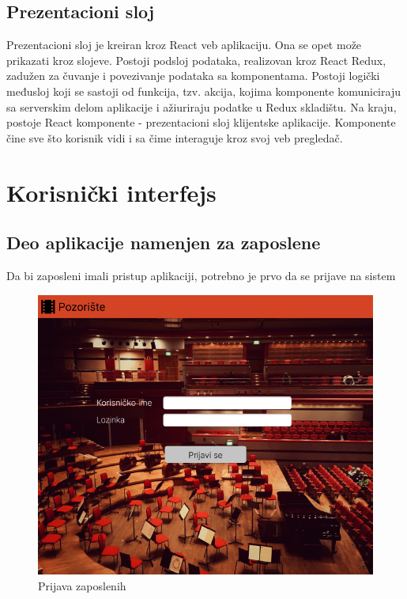 \documentclass[a4paper]{article}
\begin{document}
\subsection{Prezentacioni sloj}
Prezentacioni sloj je kreiran kroz React veb aplikaciju. Ona se opet može prikazati kroz slojeve. Postoji podsloj podataka, realizovan kroz React Redux, zadužen za čuvanje i povezivanje podataka sa komponentama. Postoji logički međusloj koji se sastoji od funkcija, tzv. akcija, kojima komponente komuniciraju sa serverskim delom aplikacije i ažiuriraju podatke u Redux skladištu. Na kraju, postoje React komponente -  prezentacioni sloj klijentske aplikacije. Komponente čine sve što korisnik vidi i sa čime interaguje kroz svoj veb pregledač.


\section{Korisnički interfejs}
\subsection{Deo aplikacije namenjen za zaposlene}
Da bi zaposleni imali pristup aplikaciji, potrebno je prvo da se prijave na sistem

\begin{figure}[H]
  \begin{center}
    \includegraphics[width=130mm]{../images/zaposleni_prijavljivanje.png}
  \end{center}
  \caption{Prijava zaposlenih}
  \label{zaposleni_prijavljivanje}
\end{figure}
\end{document}
